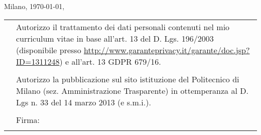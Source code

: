 \documentclass[totpages,helvetica,openbib,italian,flagCMYK]{europecv}
\begin{document}
\vspace{15pt}
\flushright
Milano, \today, \\
\vspace{10pt}
\underline{\hspace{250pt}}
	
\null{}
\flushright
\begin{tabular}{rp{250pt}}
 & \small Autorizzo il trattamento dei dati personali contenuti nel mio curriculum vitae in base all’art. 13 del D. Lgs. 196/2003 (disponibile presso
 \url{http://www.garanteprivacy.it/garante/doc.jsp?ID=1311248}) e all’art. 13 GDPR 679/16.
 \\
 \\
& \small Autorizzo la pubblicazione sul sito istituzione del Politecnico di Milano (sez. Amministrazione Trasparente)  in ottemperanza al D. Lgs n. 33 del 14 marzo 2013 (e s.m.i.).
 \\
 &  \\ 
 & Firma:\\ 
 & \underline{\hspace{250pt}} \\
\end{tabular} 
\end{document}
